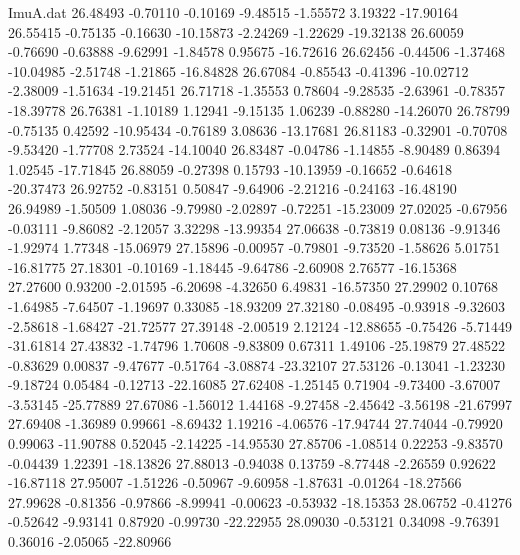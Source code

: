 \begin{filecontents}{ImuA.dat}
  26.48493   -0.70110   -0.10169   -9.48515   -1.55572    3.19322  -17.90164
  26.55415   -0.75135   -0.16630  -10.15873   -2.24269   -1.22629  -19.32138
  26.60059   -0.76690   -0.63888   -9.62991   -1.84578    0.95675  -16.72616
  26.62456   -0.44506   -1.37468  -10.04985   -2.51748   -1.21865  -16.84828
  26.67084   -0.85543   -0.41396  -10.02712   -2.38009   -1.51634  -19.21451
  26.71718   -1.35553    0.78604   -9.28535   -2.63961   -0.78357  -18.39778
  26.76381   -1.10189    1.12941   -9.15135    1.06239   -0.88280  -14.26070
  26.78799   -0.75135    0.42592  -10.95434   -0.76189    3.08636  -13.17681
  26.81183   -0.32901   -0.70708   -9.53420   -1.77708    2.73524  -14.10040
  26.83487   -0.04786   -1.14855   -8.90489    0.86394    1.02545  -17.71845
  26.88059   -0.27398    0.15793  -10.13959   -0.16652   -0.64618  -20.37473
  26.92752   -0.83151    0.50847   -9.64906   -2.21216   -0.24163  -16.48190
  26.94989   -1.50509    1.08036   -9.79980   -2.02897   -0.72251  -15.23009
  27.02025   -0.67956   -0.03111   -9.86082   -2.12057    3.32298  -13.99354
  27.06638   -0.73819    0.08136   -9.91346   -1.92974    1.77348  -15.06979
  27.15896   -0.00957   -0.79801   -9.73520   -1.58626    5.01751  -16.81775
  27.18301   -0.10169   -1.18445   -9.64786   -2.60908    2.76577  -16.15368
  27.27600    0.93200   -2.01595   -6.20698   -4.32650    6.49831  -16.57350
  27.29902    0.10768   -1.64985   -7.64507   -1.19697    0.33085  -18.93209
  27.32180   -0.08495   -0.93918   -9.32603   -2.58618   -1.68427  -21.72577
  27.39148   -2.00519    2.12124  -12.88655   -0.75426   -5.71449  -31.61814
  27.43832   -1.74796    1.70608   -9.83809    0.67311    1.49106  -25.19879
  27.48522   -0.83629    0.00837   -9.47677   -0.51764   -3.08874  -23.32107
  27.53126   -0.13041   -1.23230   -9.18724    0.05484   -0.12713  -22.16085
  27.62408   -1.25145    0.71904   -9.73400   -3.67007   -3.53145  -25.77889
  27.67086   -1.56012    1.44168   -9.27458   -2.45642   -3.56198  -21.67997
  27.69408   -1.36989    0.99661   -8.69432    1.19216   -4.06576  -17.94744
  27.74044   -0.79920    0.99063  -11.90788    0.52045   -2.14225  -14.95530
  27.85706   -1.08514    0.22253   -9.83570   -0.04439    1.22391  -18.13826
  27.88013   -0.94038    0.13759   -8.77448   -2.26559    0.92622  -16.87118
  27.95007   -1.51226   -0.50967   -9.60958   -1.87631   -0.01264  -18.27566
  27.99628   -0.81356   -0.97866   -8.99941   -0.00623   -0.53932  -18.15353
  28.06752   -0.41276   -0.52642   -9.93141    0.87920   -0.99730  -22.22955
  28.09030   -0.53121    0.34098   -9.76391    0.36016   -2.05065  -22.80966

\end{filecontents}
